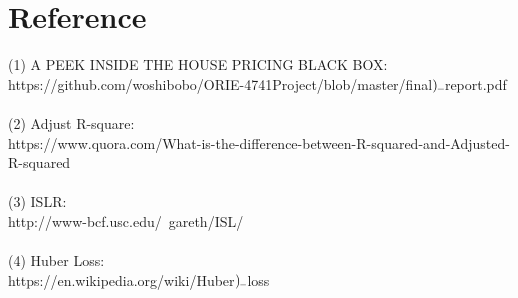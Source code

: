 \documentclass[12pt,twocolumn,twoside]{article}
\begin{document}
\section{Reference}
(1) A PEEK INSIDE THE HOUSE PRICING BLACK BOX: \\
https://github.com/woshibobo/ORIE-4741Project/blob/master/final$\rule{0.15cm}{0.1mm)}$report.pdf\\
\\(2) Adjust R-square:\\
https://www.quora.com/What-is-the-difference-between-R-squared-and-Adjusted-R-squared\\
\\(3) ISLR:\\
http://www-bcf.usc.edu/~gareth/ISL/\\
\\(4) Huber Loss:\\
https://en.wikipedia.org/wiki/Huber$\rule{0.15cm}{0.1mm)}$loss
\lipsum[0]
\end{document}
